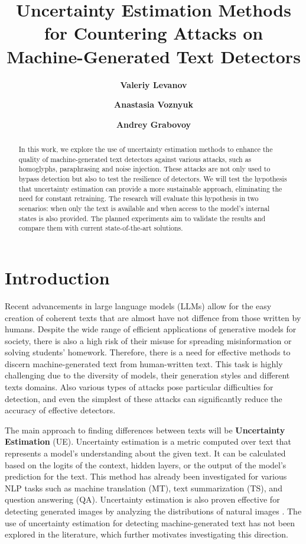 \documentclass[a4paper, 12pt]{article}
\title{Uncertainty Estimation Methods for Countering Attacks on Machine-Generated Text Detectors}
\author[1]{\textbf{Valeriy Levanov}}
\author[1]{\textbf{Anastasia Voznyuk}}
\author[1]{\textbf{Andrey Grabovoy}}
\affil[1]{\texttt{Moscow Institute of Physics and Technology, Moscow}}
\begin{document}
\maketitle



\begin{abstract}
	In this work, we explore the use of uncertainty estimation methods to enhance the quality of machine-generated text detectors against various attacks, such as homoglyphs, paraphrasing and noise injection. These attacks are not only used to bypass detection but also to test the resilience of detectors. We will test the hypothesis that uncertainty estimation can provide a more sustainable approach, eliminating the need for constant retraining. The research will evaluate this hypothesis in two scenarios: when only the text is available and when access to the model's internal states is also provided. The planned experiments aim to validate the results and compare them with current state-of-the-art solutions.
\end{abstract}

\section{Introduction}
Recent advancements in large language models (LLMs) allow for the easy creation of coherent texts that are almost have not diffence from those written by humans. Despite the wide range of efficient applications of generative models for society, there is also a high risk of their misuse for spreading misinformation or solving students' homework. Therefore, there is a need for effective methods to discern machine-generated text from human-written text. This task is highly challenging due to the diversity of models, their generation styles and different texts domains. Also various types of attacks pose particular difficulties for detection, and even the simplest of these attacks can significantly reduce the accuracy of effective detectors.

The main approach to finding differences between texts will be \textbf{Uncertainty Estimation} (UE). Uncertainty estimation is a metric computed over text that represents a model’s understanding about the given text. It can be calculated based on the logits of the context, hidden layers, or the output of the model’s prediction for the text. This method has already been investigated for various NLP tasks such as machine translation (MT), text summarization (TS), and question answering (QA)\citep{Polygraph}. Uncertainty estimation is also proven effective for detecting generated images by analyzing the distributions of natural images \citep{Image_uncertainty}. The use of uncertainty estimation for detecting machine-generated text has not been explored in the literature, which further motivates investigating this direction.
\end{document}
